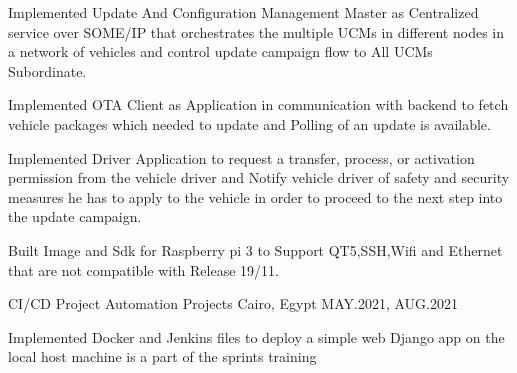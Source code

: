 \begin{cventries}
{\begin{cvitems}
        \item {\normalsize Implemented Update And Configuration Management Master as Centralized service over SOME/IP that orchestrates the multiple UCMs in different nodes in a network of vehicles and control update campaign flow to All UCMs Subordinate.}
        \item{\normalsize Implemented OTA Client as Application in communication with backend to fetch vehicle packages which needed to update and Polling of an update is available.}
        \item{\normalsize Implemented Driver Application to request a transfer, process, or activation permission from the vehicle driver and Notify vehicle driver of safety and security measures he has to apply to the vehicle in order to proceed to the next step into the update campaign.}
        \item{\normalsize Built Image and Sdk for Raspberry pi 3 to Support QT5,SSH,Wifi and Ethernet that are not compatible with Release 19/11.}
      \end{cvitems}
}
\cventry
{\normalsize CI/CD Project} %
{\Large Automation Projects} %
{\normalsize Cairo, Egypt} %
{\normalsize MAY.2021, AUG.2021} %
{
      \begin{cvitems} %
        \item {Implemented Docker and Jenkins files to deploy a simple web Django app on the local host machine is a part of the sprints training}
      \end{cvitems}
}  
\end{cventries}
